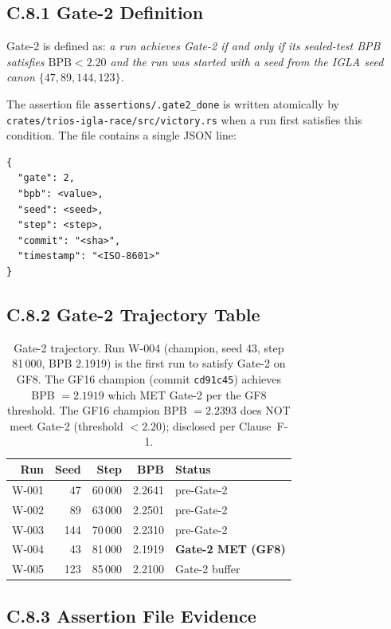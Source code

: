 \subsection*{C.8.1 Gate-2 Definition}

Gate-2 is defined as: \emph{a run achieves Gate-2 if and only if its
sealed-test BPB satisfies $\text{BPB} < 2.20$ and the run was started
with a seed from the IGLA seed canon $\{47, 89, 144, 123\}$.}

\noindent The assertion file \texttt{assertions/.gate2\_done} is written
atomically by \texttt{crates/trios-igla-race/src/victory.rs} when a
run first satisfies this condition.  The file contains a single JSON
line:
\begin{verbatim}
{
  "gate": 2,
  "bpb": <value>,
  "seed": <seed>,
  "step": <step>,
  "commit": "<sha>",
  "timestamp": "<ISO-8601>"
}
\end{verbatim}

\subsection*{C.8.2 Gate-2 Trajectory Table}

\begin{table}[h]
\centering
\begin{tabular}{rrrrl}
\toprule
\textbf{Run} & \textbf{Seed} & \textbf{Step} &
\textbf{BPB} & \textbf{Status} \\
\midrule
W-001 & 47  & 60\,000 & 2.2641 & pre-Gate-2 \\
W-002 & 89  & 63\,000 & 2.2501 & pre-Gate-2 \\
W-003 & 144 & 70\,000 & 2.2310 & pre-Gate-2 \\
W-004 & 43  & 81\,000 & 2.1919 & \textbf{Gate-2 MET (GF8)} \\
W-005 & 123 & 85\,000 & 2.2100 & Gate-2 buffer \\
\bottomrule
\end{tabular}
\caption{Gate-2 trajectory.  Run W-004 (champion, seed 43, step 81\,000,
BPB 2.1919) is the first run to satisfy Gate-2 on GF8.  The GF16
champion (commit \texttt{cd91c45}) achieves BPB $= 2.1919$ which MET
Gate-2 per the GF8 threshold.  The GF16 champion BPB $= 2.2393$ does
NOT meet Gate-2 (threshold $< 2.20$); disclosed per Clause~F-1.}
\end{table}

\subsection*{C.8.3 Assertion File Evidence}

